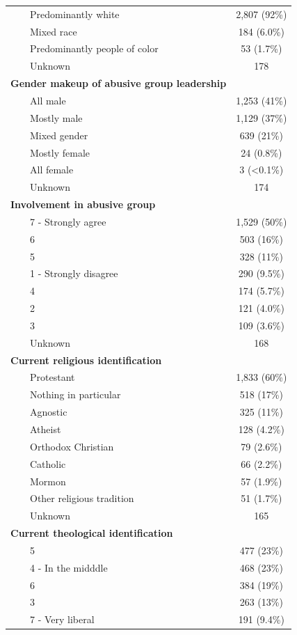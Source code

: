 \documentclass[
  letterpaper,
]{article}
\begin{document}
\begin{longtable}{lc}
    Predominantly white & 2,807 (92\%) \\ 
    Mixed race & 184 (6.0\%) \\ 
    Predominantly people of color & 53 (1.7\%) \\ 
    Unknown & 178 \\ 
{\bfseries Gender makeup of abusive group leadership} &  \\ 
    All male & 1,253 (41\%) \\ 
    Mostly male & 1,129 (37\%) \\ 
    Mixed gender & 639 (21\%) \\ 
    Mostly female & 24 (0.8\%) \\ 
    All female & 3 (<0.1\%) \\ 
    Unknown & 174 \\ 
{\bfseries Involvement in abusive group} &  \\ 
    7 - Strongly agree & 1,529 (50\%) \\ 
    6 & 503 (16\%) \\ 
    5 & 328 (11\%) \\ 
    1 - Strongly disagree & 290 (9.5\%) \\ 
    4 & 174 (5.7\%) \\ 
    2 & 121 (4.0\%) \\ 
    3 & 109 (3.6\%) \\ 
    Unknown & 168 \\ 
{\bfseries Current religious identification} &  \\ 
    Protestant & 1,833 (60\%) \\ 
    Nothing in particular & 518 (17\%) \\ 
    Agnostic & 325 (11\%) \\ 
    Atheist & 128 (4.2\%) \\ 
    Orthodox Christian & 79 (2.6\%) \\ 
    Catholic & 66 (2.2\%) \\ 
    Mormon & 57 (1.9\%) \\ 
    Other religious tradition & 51 (1.7\%) \\ 
    Unknown & 165 \\ 
{\bfseries Current theological identification} &  \\ 
    5 & 477 (23\%) \\ 
    4 - In the midddle & 468 (23\%) \\ 
    6 & 384 (19\%) \\ 
    3 & 263 (13\%) \\ 
    7 - Very liberal & 191 (9.4\%) \\ 

\end{longtable}
\end{document}
